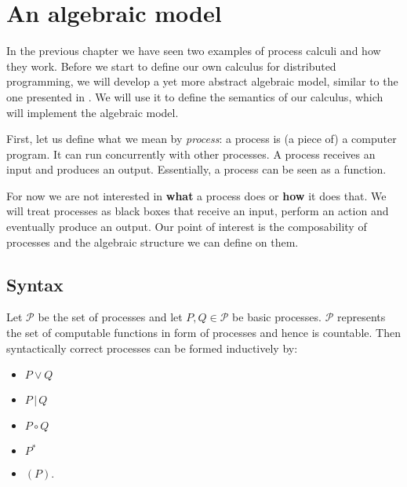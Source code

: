 \chapter{An algebraic model}
\label{chp:algebraic_model}
In the previous chapter we have seen two examples of process calculi and how they work. Before we start to define our own calculus for distributed programming, we will develop a yet more abstract algebraic model, similar to the one presented in \cite{Hoare:2012:LPU:2368298.2368301}. We will use it to define the semantics of our calculus, which will implement the algebraic model.

First, let us define what we mean by \textit{process}: a process is (a piece of) a computer program. It can run concurrently with other processes. A process receives an input and produces an output. Essentially, a process can be seen as a function. %

For now we are not interested in \textbf{what} a process does or \textbf{how} it does that. We will treat processes as black boxes that receive an input, perform an action and eventually produce an output. Our point of interest is the composability of processes and the algebraic structure we can define on them.

\section{Syntax}
\label{chp:syntax}
Let $\mathcal{P}$ be the set of processes and let $P, Q \in \mathcal{P}$ be basic processes. $\mathcal{P}$ represents the set of computable functions in form of processes and hence is countable. Then syntactically correct processes can be formed inductively by:
\begin{itemize}
  \item $P \vee Q$
  \vspace*{-0.25em}
  \item $P \,|\, Q$
  \vspace*{-0.25em}
  \item $P \circ Q$
  \vspace*{-0.25em}
  \item $P^*$
  \vspace*{-0.25em}
  \item $\left( P \right)$.
\end{itemize}

